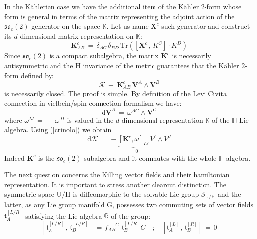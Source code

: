 \documentclass[10pt,a4paper]{article}
\newcommand{\so}{\mathfrak{so}}
\begin{document}
In the K\"ahlerian case we have the additional item of the K\"ahler $2$-form whose form is general in terms of the matrix representing the adjoint action of the $\so_c(2)$ generator on the space $\mathbb{K}$. Let us name $\mathbf{X}^c$ such generator and construct its $d$-dimensional matrix representation on $\mathbb{K}$:
\begin{equation}\label{cratello}
  \mathbf{K}^{c}_{AB} \, = \, \delta_{AC} \, \delta_{BD}\, \text{Tr}\left( \left[\mathbf{X}^c\, ,\,K^C\right]\cdot K^D\right)
\end{equation}
Since $\so_c(2)$ is a compact subalgebra, the matrix $\mathbf{K}^{c}$ is necessarily antisymmetric and the
$\mathrm{H}$ invariance of the metric guarantees that the K\"ahler $2$-form defined by:
\begin{equation}\label{kalledue}
  \boldsymbol{\mathcal{K}} \, \equiv \, \mathbf{K}^{c}_{AB} \, \mathbf{V}^A \wedge \mathbf{V}^B
\end{equation}
is necessarily closed. The proof is simple. By definition of the Levi Civita connection in vielbein/spin-connection formalism we have:
\begin{equation}\label{crinolo}
  \mathrm{d}\mathbf{V}^A \, = \, \omega^{AC}\wedge \mathbf{V}^C
\end{equation}
where $\omega^{IJ}\, = \, -\, \omega^{JI}$ is valued in the $d$-dimensional representation $\mathbb{K}$ of the
$\mathbb{H}$ Lie algebra. Using (\ref{crinolo}) we obtain
\begin{equation}\label{barlacco}
  \mathrm{d}\boldsymbol{\mathcal{K}} \, = \, - \underbrace{\left[\mathbf{K}^{c}, \omega\right]_{IJ}}_{=0} \, V^I \wedge V^J
\end{equation}
Indeed $\mathbf{K}^{c}$ is the $\so_c(2)$ subalgebra and it commutes with the whole $\mathbb{H}$-algebra.
\par
The next question concerns the Killing vector fields and their hamiltonian representation. It is important to stress another clearcut distinction. The symmetric space $\mathrm{U/H}$ is diffeomorphic to the solvable Lie group
$\mathcal{S}_{\mathrm{U/H}}$ and the latter, as any Lie group manifold $\mathrm{G}$, possesses two commuting sets of vector fields $\boldsymbol{\mathfrak{t}}^{[L/R]}_A$ satisfying the Lie algebra $\mathbb{G}$ of the group:
\begin{equation}\label{tournedorossini}
  \left[\boldsymbol{\mathfrak{t}}^{[L/R]}_A\, , \, \boldsymbol{\mathfrak{t}}^{[L/R]}_B\right] \, = \,
  f_{AB}^{\phantom{AB}C} \,\, \boldsymbol{\mathfrak{t}}^{[L/R]}_B C \quad ; \quad \left[\boldsymbol{\mathfrak{t}}^{[L]}_A\, , \, \boldsymbol{\mathfrak{t}}^{[R]}_B\right]\, = \, 0
\end{equation}
\end{document}
